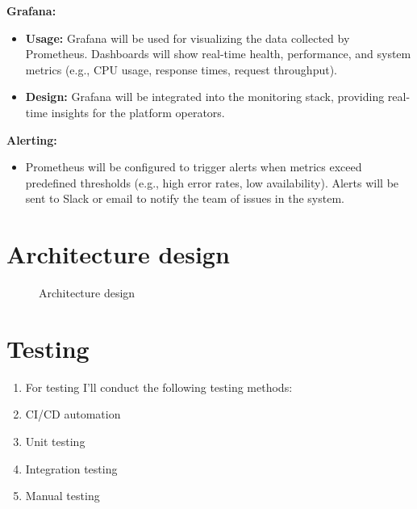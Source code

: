 \documentclass[12pt]{report}
\begin{document}
\textbf{Grafana:}
\begin{itemize}
    \item \textbf{Usage:} Grafana will be used for visualizing the data collected by Prometheus. Dashboards will show real-time health, performance, and system metrics (e.g., CPU usage, response times, request throughput).
    \item \textbf{Design:} Grafana will be integrated into the monitoring stack, providing real-time insights for the platform operators.
\end{itemize}

\textbf{Alerting:}
\begin{itemize}
    \item Prometheus will be configured to trigger alerts when metrics exceed predefined thresholds (e.g., high error rates, low availability). Alerts will be sent to Slack or email to notify the team of issues in the system.
\end{itemize}














\chapter{Architecture design} 

     \begin{figure}[htbp]
      \centering
        \caption{Architecture design} 
    \end{figure}   

\chapter{Testing} 

\begin{enumerate}

    \item[]For testing I'll conduct the following testing methods:

    \item CI/CD automation

      \item Unit testing 

      \item Integration testing 

      \item Manual testing 

\end{enumerate}
\end{document}
